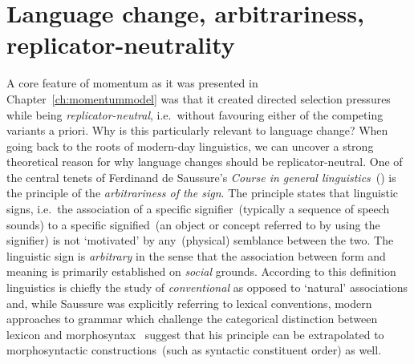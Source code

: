 

\section{Language change, arbitrariness, replicator-neutrality}
\label{sec:arbitrariness}

A core feature of momentum as it was presented in Chapter~\ref{ch:momentummodel} was that it created directed selection pressures while being \emph{replicator-neutral}, i.e.~without favouring either of the competing variants a priori. Why is this particularly relevant to language change?
When going back to the roots of modern-day linguistics, we can uncover a strong theoretical reason for why language changes should be replicator-neutral. One of the central tenets of Ferdinand de Saussure's \emph{Course in general linguistics}~(\citeyear{Saussure1959}) is the principle of the \emph{arbitrariness of the sign}. The principle states that linguistic signs, i.e.~the association of a specific signifier~(typically a sequence of speech sounds) to a specific signified~(an object or concept referred to by using the signifier) is not `motivated' by any~(physical) semblance between the two. The linguistic sign is \emph{arbitrary} in the sense that the association between form and meaning is primarily established on \emph{social} grounds.
According to this definition linguistics is chiefly the study of \emph{conventional} as opposed to `natural' associations and, while Saussure was explicitly referring to lexical conventions, modern approaches to grammar which challenge the categorical distinction between lexicon and morphosyntax~\citep[e.g.~Construction Grammar, ][]{Goldberg1995} suggest that his principle can be extrapolated to morphosyntactic constructions~(such as syntactic constituent order) as well.

